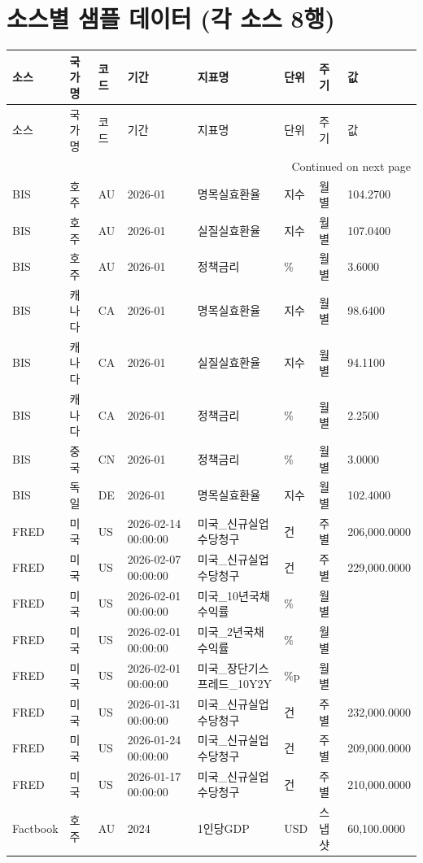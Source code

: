 \documentclass[11pt,a4paper]{article}
\begin{document}
\section{소스별 샘플 데이터 (각 소스 8행)}
\begin{longtable}{llllllll}
\toprule
소스 & 국가명 & 코드 & 기간 & 지표명 & 단위 & 주기 & 값 \\
\midrule
\endfirsthead
\toprule
소스 & 국가명 & 코드 & 기간 & 지표명 & 단위 & 주기 & 값 \\
\midrule
\endhead
\midrule
\multicolumn{8}{r}{Continued on next page} \\
\midrule
\endfoot
\bottomrule
\endlastfoot
BIS & 호주 & AU & 2026-01 & 명목실효환율 & 지수 & 월별 & 104.2700 \\
BIS & 호주 & AU & 2026-01 & 실질실효환율 & 지수 & 월별 & 107.0400 \\
BIS & 호주 & AU & 2026-01 & 정책금리 & \% & 월별 & 3.6000 \\
BIS & 캐나다 & CA & 2026-01 & 명목실효환율 & 지수 & 월별 & 98.6400 \\
BIS & 캐나다 & CA & 2026-01 & 실질실효환율 & 지수 & 월별 & 94.1100 \\
BIS & 캐나다 & CA & 2026-01 & 정책금리 & \% & 월별 & 2.2500 \\
BIS & 중국 & CN & 2026-01 & 정책금리 & \% & 월별 & 3.0000 \\
BIS & 독일 & DE & 2026-01 & 명목실효환율 & 지수 & 월별 & 102.4000 \\
FRED & 미국 & US & 2026-02-14 00:00:00 & 미국\_신규실업수당청구 & 건 & 주별 & 206,000.0000 \\
FRED & 미국 & US & 2026-02-07 00:00:00 & 미국\_신규실업수당청구 & 건 & 주별 & 229,000.0000 \\
FRED & 미국 & US & 2026-02-01 00:00:00 & 미국\_10년국채수익률 & \% & 월별 &  \\
FRED & 미국 & US & 2026-02-01 00:00:00 & 미국\_2년국채수익률 & \% & 월별 &  \\
FRED & 미국 & US & 2026-02-01 00:00:00 & 미국\_장단기스프레드\_10Y2Y & \%p & 월별 &  \\
FRED & 미국 & US & 2026-01-31 00:00:00 & 미국\_신규실업수당청구 & 건 & 주별 & 232,000.0000 \\
FRED & 미국 & US & 2026-01-24 00:00:00 & 미국\_신규실업수당청구 & 건 & 주별 & 209,000.0000 \\
FRED & 미국 & US & 2026-01-17 00:00:00 & 미국\_신규실업수당청구 & 건 & 주별 & 210,000.0000 \\
Factbook & 호주 & AU & 2024 & 1인당GDP & USD & 스냅샷 & 60,100.0000 \\

\end{longtable}
\end{document}
